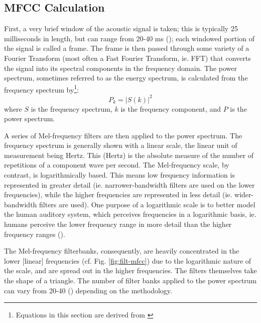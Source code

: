 \DIFdelbegin \subsubsection{}%
\addtocounter{subsubsection}{-1}%
\DIFdelend \DIFaddbegin \subsection{MFCC Calculation}\DIFaddend \label{sec:mfcc-calc}

First, a very brief window of the acoustic signal is taken; this is typically 25 milliseconds in length, but can range from 20-40 ms (\cite{vergin:99,molau:01}); each windowed portion of the signal is called a frame.  The frame is then passed through some variety of a Fourier Transform (most often a Fast Fourier Transform, ie. FFT) that converts the signal into its spectral components in the frequency domain.  The power spectrum, sometimes referred to as the energy spectrum, is calculated from the frequency spectrum by\footnote{Equations in this section are derived from \cite{vergin:99}}: \begin{equation}\label{eq:power-spectrum} P_k = |S(k)|^2 \end{equation} where $S$ is the frequency spectrum, $k$ is the frequency component, and $P$ is the power spectrum.

A series of Mel-frequency filters are then applied to the power spectrum.  The frequency spectrum is generally shown with a linear scale, the linear unit of measurement being Hertz.  This (Hertz) is the absolute measure of the number of repetitions of a component wave per second.  The Mel-frequency scale, by contrast, is logarithmically based.  This means low frequency information is represented in greater detail (ie. narrower-bandwidth filters are used on the lower frequencies), while the higher frequencies are represented in less detail (ie. wider-bandwidth filters are used).  One purpose of a logarithmic scale is to better model the human auditory system, which perceives frequencies in a logarithmic basis, ie. humans perceive the lower frequency range in more detail than the higher frequency ranges (\cite{rosen:91}).

The Mel-frequency filterbanks, consequently, are heavily concentrated in the lower [linear] frequencies (cf. Fig. \ref{fig:filt-mfcc}) due to the logarithmic nature of the scale, and are spread out in the higher frequencies. The filters themselves take the shape of a triangle.  The number of filter banks applied to the power spectrum can vary from 20-40 (\cite{honig:05,gold:11}) depending on the methodology. 

